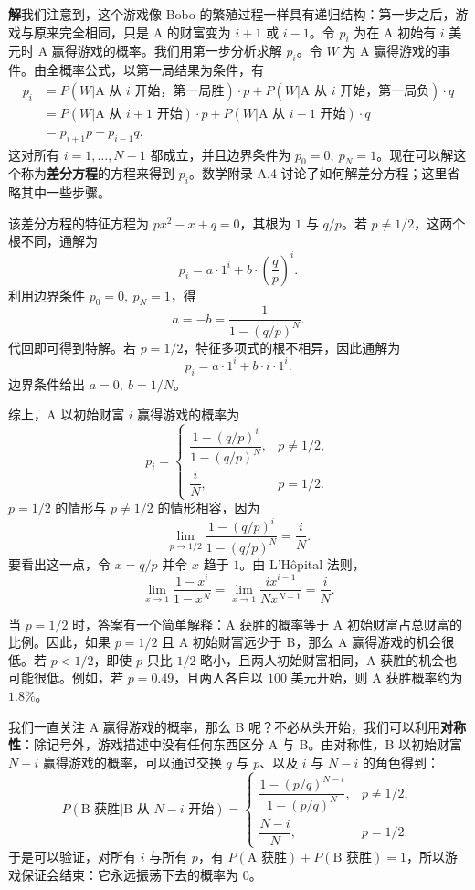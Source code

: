 \documentclass[UTF8, 12pt, fontset=fandol, oneside]{ctexart}
\begin{document}
\noindent\textbf{解}\quad 我们注意到，这个游戏像 Bobo 的繁殖过程一样具有递归结构：第一步之后，游戏与原来完全相同，只是 A 的财富变为 $i+1$ 或 $i-1$。令 $p_i$ 为在 A 初始有 $i$ 美元时 A 赢得游戏的概率。我们用第一步分析求解 $p_i$。令 $W$ 为 A 赢得游戏的事件。由全概率公式，以第一局结果为条件，有
\[
\begin{aligned}
  p_i
  &=
  P(W|\text{A 从 } i \text{ 开始，第一局胜})\cdot p
  +P(W|\text{A 从 } i \text{ 开始，第一局负})\cdot q\\
  &=
  P(W|\text{A 从 } i+1 \text{ 开始})\cdot p
  +P(W|\text{A 从 } i-1 \text{ 开始})\cdot q\\
  &=
  p_{i+1}p+p_{i-1}q.
\end{aligned}
\]
这对所有 $i=1,\ldots,N-1$ 都成立，并且边界条件为 $p_0=0,\ p_N=1$。现在可以解这个称为\textbf{差分方程}的方程来得到 $p_i$。数学附录 A.4 讨论了如何解差分方程；这里省略其中一些步骤。

该差分方程的特征方程为 $px^2-x+q=0$，其根为 $1$ 与 $q/p$。若 $p\ne 1/2$，这两个根不同，通解为
\[
  p_i=a\cdot 1^i+b\cdot\left(\frac{q}{p}\right)^i.
\]
利用边界条件 $p_0=0,\ p_N=1$，得
\[
  a=-b=\frac{1}{1-(q/p)^N}.
\]
代回即可得到特解。若 $p=1/2$，特征多项式的根不相异，因此通解为
\[
  p_i=a\cdot 1^i+b\cdot i\cdot 1^i.
\]
边界条件给出 $a=0,\ b=1/N$。

综上，A 以初始财富 $i$ 赢得游戏的概率为
\[
  p_i=
  \begin{cases}
    \dfrac{1-(q/p)^i}{1-(q/p)^N}, & p\ne 1/2,\\[1.2ex]
    \dfrac{i}{N}, & p=1/2.
  \end{cases}
\]
$p=1/2$ 的情形与 $p\ne 1/2$ 的情形相容，因为
\[
  \lim_{p\to 1/2}\frac{1-(q/p)^i}{1-(q/p)^N}=\frac{i}{N}.
\]
要看出这一点，令 $x=q/p$ 并令 $x$ 趋于 $1$。由 L'H\^opital 法则，
\[
  \lim_{x\to 1}\frac{1-x^i}{1-x^N}
  =
  \lim_{x\to 1}\frac{i x^{i-1}}{N x^{N-1}}
  =
  \frac{i}{N}.
\]

当 $p=1/2$ 时，答案有一个简单解释：A 获胜的概率等于 A 初始财富占总财富的比例。因此，如果 $p=1/2$ 且 A 初始财富远少于 B，那么 A 赢得游戏的机会很低。若 $p<1/2$，即使 $p$ 只比 $1/2$ 略小，且两人初始财富相同，A 获胜的机会也可能很低。例如，若 $p=0.49$，且两人各自以 $100$ 美元开始，则 A 获胜概率约为 $1.8\%$。

我们一直关注 A 赢得游戏的概率，那么 B 呢？不必从头开始，我们可以利用\textbf{对称性}：除记号外，游戏描述中没有任何东西区分 A 与 B。由对称性，B 以初始财富 $N-i$ 赢得游戏的概率，可以通过交换 $q$ 与 $p$、以及 $i$ 与 $N-i$ 的角色得到：
\[
  P(\text{B 获胜}|\text{B 从 }N-i\text{ 开始})
  =
  \begin{cases}
    \dfrac{1-(p/q)^{N-i}}{1-(p/q)^N}, & p\ne 1/2,\\[1.2ex]
    \dfrac{N-i}{N}, & p=1/2.
  \end{cases}
\]
于是可以验证，对所有 $i$ 与所有 $p$，有 $P(\text{A 获胜})+P(\text{B 获胜})=1$，所以游戏保证会结束：它永远振荡下去的概率为 $0$。
\end{document}
